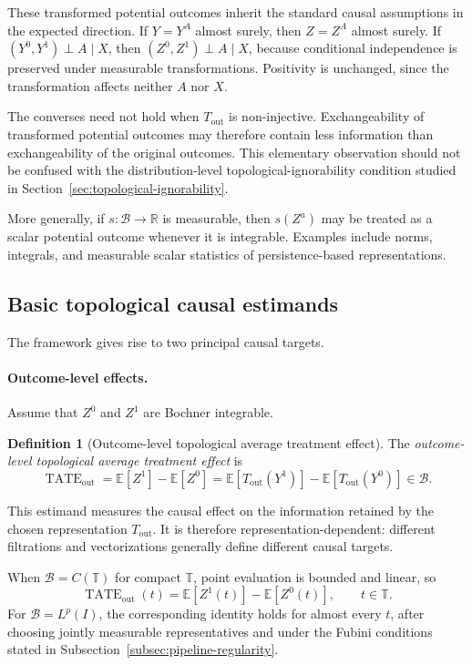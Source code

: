 \documentclass[11pt,a4paper]{article}
\theoremstyle{plain}
\theoremstyle{definition}
\newtheorem{definition}[theorem]{Definition}
\theoremstyle{remark}
\newcommand{\1}{\mathbbm{1}}
\begin{document}
These transformed potential outcomes inherit the standard causal assumptions in the expected direction. If \(Y=Y^A\) almost surely, then \(Z=Z^A\) almost surely. If \((Y^0,Y^1)\perp A\mid X\), then \((Z^0,Z^1)\perp A\mid X\), because conditional independence is preserved under measurable transformations. Positivity is unchanged,
since the transformation affects neither \(A\) nor \(X\).

The converses need not hold when \(T_{\mathrm{out}}\) is
non-injective. Exchangeability of transformed potential outcomes may therefore contain less information than exchangeability of the original outcomes. This elementary observation should not be confused with the distribution-level topological-ignorability condition studied in Section~\ref{sec:topological-ignorability}.

More generally, if \(s:\mathcal B\to\mathbb R\) is measurable, then \(s(Z^a)\) may be treated as a scalar potential outcome whenever it is integrable. Examples include norms, integrals, and measurable scalar statistics of persistence-based representations.

\subsection{Basic topological causal estimands}
\label{subsec:topological-causal-estimands}

The framework gives rise to two principal causal targets.

\paragraph{Outcome-level effects.}
Assume that \(Z^0\) and \(Z^1\) are Bochner integrable.

\begin{definition}[Outcome-level topological average treatment effect]
\label{def:outcome-level-tate}
The \emph{outcome-level topological average treatment effect} is
\[
\operatorname{TATE}_{\mathrm{out}}
=
\mathbb E[Z^1]-\mathbb E[Z^0]
=
\mathbb E[T_{\mathrm{out}}(Y^1)]
-
\mathbb E[T_{\mathrm{out}}(Y^0)]
\in\mathcal B.
\]
\end{definition}

This estimand measures the causal effect on the information retained by the chosen representation \(T_{\mathrm{out}}\). It is therefore representation-dependent: different filtrations and vectorizations generally define different causal targets.

When \(\mathcal B=C(\mathbb T)\) for compact \(\mathbb T\), point evaluation is bounded and linear, so
\[
\operatorname{TATE}_{\mathrm{out}}(t)
=
\mathbb E[Z^1(t)]-\mathbb E[Z^0(t)],
\qquad t\in\mathbb T.
\]
For \(\mathcal B=L^p(I)\), the corresponding identity holds for almost every  \(t\), after choosing jointly measurable representatives and under the Fubini conditions stated in
Subsection~\ref{subsec:pipeline-regularity}.
\end{document}
